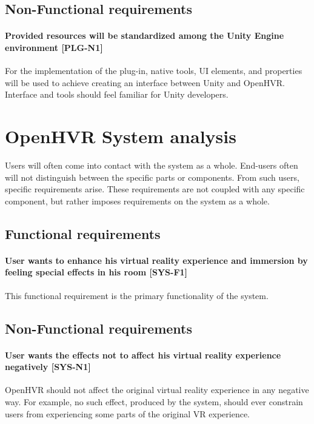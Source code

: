 \hypertarget{x-non-functional-requirements}{\subsection{Non-Functional requirements}}
\hypertarget{x-\textbf{provided-resources-will-be-standardized-among-the-unity-engine-environment}-[plg-n1]}{\paragraph*{\textbf{Provided resources will be standardized among the Unity Engine environment} [PLG-N1]}}
For the implementation of the plug-in, native tools, UI elements, and properties
will be used to achieve creating an interface between Unity and OpenHVR.
Interface and tools should feel familiar for Unity developers.


\hypertarget{x-openhvr-system-analysis}{\section{OpenHVR System analysis}}
Users will often come into contact with the system as a whole. End-users
often will not distinguish between the specific parts or components. From such
users, specific requirements arise. These requirements are not coupled with
any specific component, but rather imposes requirements on the system as a whole.


\hypertarget{x-functional-requirements}{\subsection{Functional requirements}}
\hypertarget{x-\textbf{user-wants-to-enhance-his-virtual-reality-experience-and-immersion-by-feeling-special-effects-in-his-room}-[sys-f1]}{\paragraph*{\textbf{User wants to enhance his virtual reality experience and immersion by feeling special effects in his room} [SYS-F1]}}
This functional requirement is the primary functionality of the system.


\hypertarget{x-non-functional-requirements}{\subsection{Non-Functional requirements}}
\hypertarget{x-\textbf{user-wants-the-effects-not-to-affect-his-virtual-reality-experience-negatively}-[sys-n1]}{\paragraph*{\textbf{User wants the effects not to affect his virtual reality experience negatively} [SYS-N1]}}
OpenHVR should not affect the original virtual reality experience in any
negative way. For example, no such effect, produced by the system, should ever
constrain users from experiencing some parts of the original VR experience.


